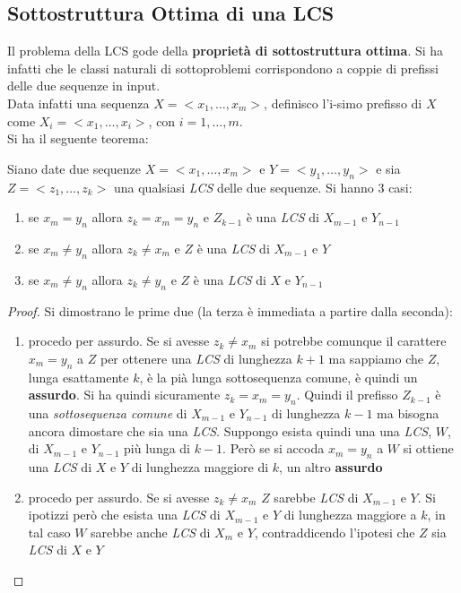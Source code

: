 \documentclass[a4paper,12pt, oneside]{book}
\begin{document}
\subsection{Sottostruttura Ottima di una LCS}
Il problema della LCS gode della \textbf{proprietà di sottostruttura
  ottima}. Si ha infatti che le classi naturali di sottoproblemi
corrispondono a coppie di prefissi delle due sequenze in input.\\ 
Data infatti una sequenza $X=<x_1,\ldots,x_m>$, definisco l'i-simo
prefisso di $X$ come $X_i=<x_1,\ldots, x_i>$, con $i=1,\ldots,m$.\\
Si ha il seguente teorema:
\begin{teorema}
  Siano date due sequenze $X=<x_1,\ldots,x_m>$ e $Y=<y_1,\ldots,y_n>$
  e sia $Z=<z_1,\ldots,z_k>$ una qualsiasi \textit{LCS} delle due
  sequenze. Si hanno 3 casi:
  \begin{enumerate}
    \item se $x_m=y_n$ allora $z_k=x_m=y_n$ e $Z_{k-1}$ è una
    \textit{LCS} di $X_{m-1}$ e $Y_{n-1}$
    \item  se $x_m\neq y_n$ allora $z_k\neq x_m$ e $Z$ è una
    \textit{LCS} di $X_{m-1}$ e $Y$
    \item  se $x_m\neq y_n$ allora $z_k\neq y_n$ e $Z$ è una
    \textit{LCS} di $X$ e $Y_{n-1}$
  \end{enumerate}
\end{teorema}
\begin{proof}
  Si dimostrano le prime due (la terza è immediata a partire dalla
  seconda):
  \begin{enumerate}
    \item procedo per assurdo. Se si avesse $z_k\neq x_m$ si potrebbe
    comunque il carattere $x_m=y_n$ a $Z$ per ottenere una
    \textit{LCS} di lunghezza $k+1$ ma sappiamo che $Z$, lunga
    esattamente $k$, è la pià lunga sottosequenza comune, è quindi un
    \textbf{assurdo}. Si ha quindi sicuramente $z_k=x_m=y_n$. Quindi
    il prefisso  $Z_{k-1}$ è una \textit{sottosequenza comune} di
    $X_{m-1}$ e $Y_{n-1}$ di lunghezza $k-1$ ma bisogna ancora
    dimostare che sia una \textit{LCS}. Suppongo esista quindi una una
    \textit{LCS}, $W$, di $X_{m-1}$ e $Y_{n-1}$ più lunga di
    $k-1$. Però se si accoda $x_m=y_n$ a $W$ si ottiene una
    \textit{LCS} di $X$ e $Y$ di lunghezza maggiore di $k$, un altro
    \textbf{assurdo} 
    \item procedo per assurdo. Se si avesse $z_k\neq x_m$ $Z$ sarebbe
    \textit{LCS} di $X_{m-1}$ e $Y$. Si ipotizzi però che esista una
    \textit{LCS} di $X_{m-1}$ e $Y$ di lunghezza maggiore a $k$, in
    tal caso $W$ sarebbe anche \textit{LCS} di $X_{m}$ e $Y$,
    contraddicendo l'ipotesi che $Z$ sia \textit{LCS} di $X$ e $Y$
  \end{enumerate}
\end{proof}
\end{document}
